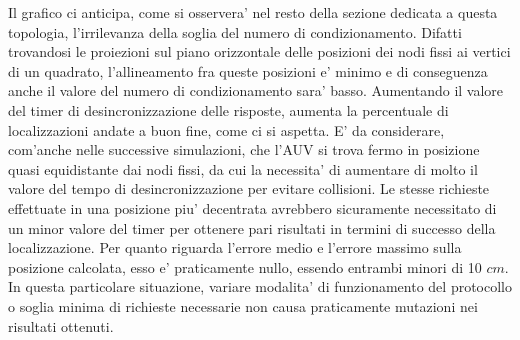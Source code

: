 \documentclass[Lau,binding=0.6cm]{sapthesis}
\begin{document}
Il grafico ci anticipa, come si osservera' nel resto della sezione dedicata a questa topologia, l'irrilevanza della soglia del numero di condizionamento. Difatti trovandosi le proiezioni sul piano orizzontale delle posizioni dei nodi fissi ai vertici di un quadrato, l'allineamento fra queste posizioni e' minimo e di conseguenza anche il valore del numero di condizionamento sara' basso. Aumentando il valore del timer di desincronizzazione delle risposte, aumenta la percentuale di localizzazioni andate a buon fine, come ci si aspetta. E' da considerare, com'anche nelle successive simulazioni, che l'AUV si trova fermo in posizione quasi equidistante dai nodi fissi, da cui la necessita' di aumentare di molto il valore del tempo di desincronizzazione per evitare collisioni. Le stesse richieste effettuate in una posizione piu' decentrata avrebbero sicuramente necessitato di un minor valore del timer per ottenere pari risultati in termini di successo della localizzazione.
Per quanto riguarda l'errore medio e l'errore massimo sulla posizione calcolata, esso e' praticamente nullo, essendo entrambi minori di 10 $cm$.
In questa particolare situazione, variare modalita' di funzionamento del protocollo o soglia minima di richieste necessarie non causa praticamente mutazioni nei risultati ottenuti.

\begin{figure}[H]
    \centering
    \hfill
\end{figure}
\end{document}
